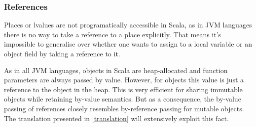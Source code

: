 \subsubsection{References}

Places or lvalues are not programatically accessible in Scala, as in JVM
languages there is no way to take a reference to a place explicitly. That means
it's impossible to generalise over whether one wants to assign to a local
variable or an object field by taking a reference to it.

As in all JVM languages, objects in Scala are heap-allocated and function
parameters are always passed by value. However, for objects this value is just a
reference to the object in the heap. This is very efficient for sharing
immutable objects while retaining by-value semantics. But as a consequence, the
by-value passing of references closely resembles by-reference passing for
mutable objects. The translation presented in \autoref{translation} will
extensively exploit this fact.
